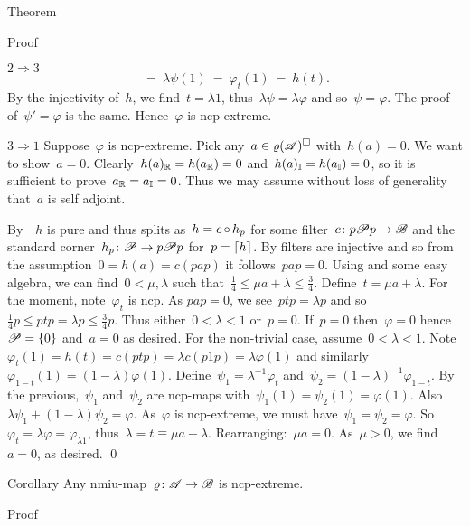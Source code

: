 \begin{parsec}
\begin{point}{Theorem}
\begin{point}{Proof}
\begin{point}{$2 \Rightarrow 3$}
\begin{equation*}
    \ =\  \lambda \psi(1)
    \ =\  \varphi_t (1)  \ =\  h(t).
\end{equation*}
By the injectivity of~$h$,
    we find~$t = \lambda 1$,
    thus~$\lambda \psi = \lambda \varphi$
    and so~$\psi = \varphi$.
The proof of~$\psi' = \varphi$ is the same.
Hence~$\varphi$ is ncp-extreme.
\end{point}
\begin{point}{$3 \Rightarrow 1$}%
Suppose~$\varphi$ is ncp-extreme.
Pick any~$a \in \varrho(\mathscr{A})^\square$ with~$h(a) = 0$.
We want to show~$a = 0$.
Clearly~$h(a)_{\mathbb{R}} = h(a_{\mathbb{R}}) = 0$
and~$h(a)_{\mathbb{I}} = h(a_{\mathbb{I}}) = 0$,
so it is sufficient to prove~$a_{\mathbb{R}} = a_{\mathbb{I}}=0$.
Thus we may assume without loss of generality that~$a$ is self adjoint.

By~~$h$ is pure
    and thus splits as~$h = c \mathop{\circ} h_p$
    for some filter~$c \colon p\mathscr{P} p \to \mathscr{B}$
    and the standard corner~$h_p\colon \mathscr{P} \to p\mathscr{P} p$
    for~$p = \left\lceil h\right\rceil$.
By  filters are injective
    and so from the assumption~$0 = h(a) = c(pap)$
    it follows~$pap = 0$.
Using  and some easy algebra,
    we can find~$0 < \mu,\lambda$
    such that~$\frac{1}{4} \leq \mu a + \lambda \leq \frac{3}{4}$.
Define~$t = \mu a + \lambda$.
For the moment, note~$\varphi_t$ is ncp.
As $pap = 0$, we see~$ptp = \lambda p$ and
so~$\frac{1}{4} p \leq  ptp = \lambda p
    \leq \frac{3}{4} p$.
Thus either~$0 < \lambda < 1$ or~$p = 0$.
If~$p = 0$ then~$\varphi=0$ hence~$\mathscr{P} = \{0\}$
    and~$a = 0$ as desired.
For the non-trivial case, assume~$0 < \lambda <1$.
Note~$\varphi_t(1) = h(t) = c(ptp) = \lambda c(p1p) = \lambda \varphi(1)$
    and similarly~$\varphi_{1-t}(1) = (1-\lambda) \varphi(1)$.
Define~$\psi_1 = \lambda^{-1} \varphi_t$
and~$\psi_2 = (1-\lambda)^{-1}\varphi_{1-t}$.
By the previous,~$\psi_1$ and~$\psi_2$ are ncp-maps
    with~$\psi_1(1)=\psi_2(1)=\varphi(1)$.
    Also~$\lambda \psi_1 + (1-\lambda) \psi_2 = \varphi$.
As~$\varphi$ is ncp-extreme,
    we must have~$\psi_1 = \psi_2 = \varphi$.
So~$\varphi_t = \lambda \varphi = \varphi_{\lambda 1}$,
    thus~$\lambda = t \equiv \mu a + \lambda$.
    Rearranging:~$\mu a = 0$.
    As~$\mu > 0$, we find~$a=0$, as desired. \qed
\end{point}
\end{point}
\end{point}
\begin{point}{Corollary}%
Any nmiu-map~$\varrho\colon \mathscr{A} \to \mathscr{B}$ is ncp-extreme. 
\begin{point}{Proof}%

\end{point}
\end{point}
\end{parsec}
